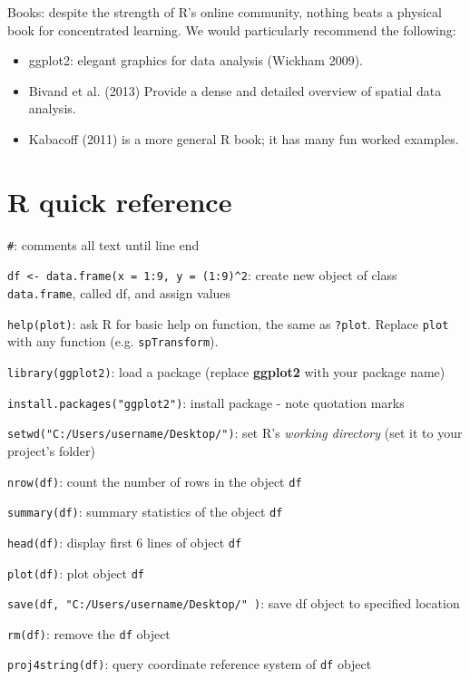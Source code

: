 \documentclass[]{article}
\begin{document}
Books: despite the strength of R's online community, nothing beats a
physical book for concentrated learning. We would particularly recommend
the following:

\begin{itemize}
\itemsep1pt\parskip0pt
\item
  ggplot2: elegant graphics for data analysis (Wickham 2009).
\item
  Bivand et al. (2013) Provide a dense and detailed overview of spatial
  data analysis.
\item
  Kabacoff (2011) is a more general R book; it has many fun worked
  examples.
\end{itemize}

\section{R quick reference}\label{r-quick-reference}

\texttt{\#}: comments all text until line end

\texttt{df \textless{}- data.frame(x = 1:9, y = (1:9)\^{}2}: create new
object of class \texttt{data.frame}, called df, and assign values

\texttt{help(plot)}: ask R for basic help on function, the same as
\texttt{?plot}. Replace \texttt{plot} with any function (e.g.
\texttt{spTransform}).

\texttt{library(ggplot2)}: load a package (replace \textbf{ggplot2} with
your package name)

\texttt{install.packages("ggplot2")}: install package - note quotation
marks

\texttt{setwd("C:/Users/username/Desktop/")}: set R's \emph{working
directory} (set it to your project's folder)

\texttt{nrow(df)}: count the number of rows in the object \texttt{df}

\texttt{summary(df)}: summary statistics of the object \texttt{df}

\texttt{head(df)}: display first 6 lines of object \texttt{df}

\texttt{plot(df)}: plot object \texttt{df}

\texttt{save(df, "C:/Users/username/Desktop/" )}: save df object to
specified location

\texttt{rm(df)}: remove the \texttt{df} object

\texttt{proj4string(df)}: query coordinate reference system of
\texttt{df} object
\end{document}
